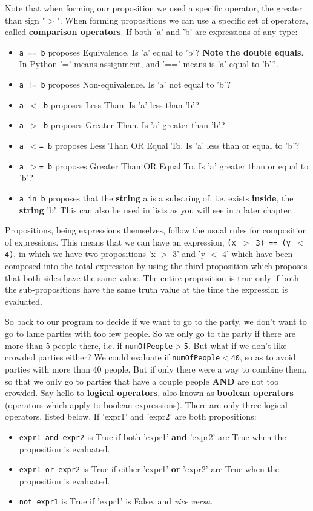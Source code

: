 Note that when forming our proposition we used a specific operator,   the greater than sign "$>$". When forming propositions we can use a   specific set of operators, called \textbf{comparison   operators}. If both 'a' and 'b' are expressions of any   type:
\begin{itemize}
	\item 
\texttt{a == b} proposes Equivalence. Is 'a' equal to 'b'?    \textbf{Note the double equals}. In Python '=' means    assignment, and '==' means is 'a' equal to 'b'?.
	\item 
\texttt{a != b} proposes Non-equivalence. Is 'a' not equal    to 'b'?
	\item 
\texttt{a $<$ b} proposes Less Than. Is 'a' less than    'b'?
	\item 
\texttt{a $>$ b} proposes Greater Than. Is 'a' greater    than 'b'?
	\item 
\texttt{a $<$= b} proposes Less Than OR Equal To. Is 'a'    less than or equal to 'b'?
	\item 
\texttt{a $>$= b} proposes Greater Than OR Equal To. Is    'a' greater than or equal to 'b'?
	\item 
\texttt{a in b} proposes that the \textbf{string} a    is a substring of, i.e. exists \textbf{inside}, the    \textbf{string} 'b'. This can also be used in lists as you will see in a later chapter.
\end{itemize}

Propositions, being expressions themselves, follow the usual rules   for composition of expressions. This means that we can have an   expression, 
\texttt{(x $>$ 3) == (y $<$ 4)}, in which we have two   propositions 'x $>$ 3' and 'y $<$ 4' which have been composed into   the total expression by using the third proposition which proposes that both sides have the same value. The entire proposition is true only if both the   sub-propositions have the same truth value at the time the expression   is evaluated.

So back to our program to decide if we want to go to the party, we don't want to go to lame parties with too few people. So we only go to the party if there are more than 5 people there, i.e. if 
\texttt{numOfPeople$>$5}. But what if we don't like crowded parties either? We could evaluate if 
\texttt{numOfPeople$<$40}, so as to avoid parties with more than 40 people. But if only there were a way to combine them, so that we only go to parties that have a couple people \textbf{AND} are not too crowded. Say hello to \textbf{logical operators}, also known   as \textbf{boolean operators} (operators which apply to boolean expressions). There   are only three logical operators, listed below. If 'expr1' and 'expr2'   are both propositions:
\begin{itemize}
	\item 
\texttt{expr1 and expr2} is True if both 'expr1'    \textbf{and} 'expr2' are True when the proposition is    evaluated.
	\item 
\texttt{expr1 or expr2} is True if either 'expr1'    \textbf{or} 'expr2' are True when the proposition is    evaluated.
	\item 
\texttt{not expr1} is True if 'expr1' is False, and \textit{vice    versa}.
\end{itemize}

